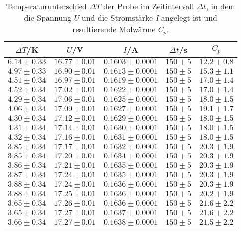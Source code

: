 \begin{table}
  \centering
  \caption{Temperaturunterschied $\Delta T$ der Probe im Zeitintervall $\Delta t$, in dem die Spannung $U$ und die Stromstärke $I$ angelegt ist und resultierende Molwärme $C_p$.}
  \label{tab:tab1}
  \begin{tabular}{c c c c c}
    \toprule
		$\Delta T$/K & $U$/V & $I$/A & $\Delta t$/s & $C_p$ \\
    \midrule
		$6.14\pm0.33$ & $16.77\pm0.01$ & $0.1603\pm0.0001$ & $150\pm5$ & $12.2\pm0.8$ \\
		$4.97\pm0.33$ & $16.90\pm0.01$ & $0.1613\pm0.0001$ & $150\pm5$ & $15.3\pm1.1$ \\
		$4.51\pm0.34$ & $16.97\pm0.01$ & $0.1619\pm0.0001$ & $150\pm5$ & $17.0\pm1.4$ \\
		$4.52\pm0.34$ & $17.02\pm0.01$ & $0.1622\pm0.0001$ & $150\pm5$ & $17.0\pm1.4$ \\
		$4.29\pm0.34$ & $17.06\pm0.01$ & $0.1625\pm0.0001$ & $150\pm5$ & $18.0\pm1.5$ \\
		$4.06\pm0.34$ & $17.09\pm0.01$ & $0.1627\pm0.0001$ & $150\pm5$ & $19.1\pm1.7$ \\
		$4.30\pm0.34$ & $17.12\pm0.01$ & $0.1629\pm0.0001$ & $150\pm5$ & $18.0\pm1.5$ \\
		$4.31\pm0.34$ & $17.14\pm0.01$ & $0.1630\pm0.0001$ & $150\pm5$ & $18.0\pm1.5$ \\
		$4.32\pm0.34$ & $17.16\pm0.01$ & $0.1631\pm0.0001$ & $150\pm5$ & $18.0\pm1.5$ \\
		$3.85\pm0.34$ & $17.17\pm0.01$ & $0.1632\pm0.0001$ & $150\pm5$ & $20.3\pm1.9$ \\
		$3.85\pm0.34$ & $17.20\pm0.01$ & $0.1634\pm0.0001$ & $150\pm5$ & $20.3\pm1.9$ \\
		$3.86\pm0.34$ & $17.21\pm0.01$ & $0.1635\pm0.0001$ & $150\pm5$ & $20.3\pm1.9$ \\
		$3.87\pm0.34$ & $17.24\pm0.01$ & $0.1635\pm0.0001$ & $150\pm5$ & $20.3\pm1.9$ \\
		$3.88\pm0.34$ & $17.24\pm0.01$ & $0.1636\pm0.0001$ & $150\pm5$ & $20.3\pm1.9$ \\
		$3.88\pm0.34$ & $17.25\pm0.01$ & $0.1636\pm0.0001$ & $150\pm5$ & $20.2\pm1.9$ \\
		$3.65\pm0.34$ & $17.26\pm0.01$ & $0.1636\pm0.0001$ & $150\pm5$ & $21.6\pm2.2$ \\
		$3.65\pm0.34$ & $17.27\pm0.01$ & $0.1637\pm0.0001$ & $150\pm5$ & $21.6\pm2.2$ \\
		$3.66\pm0.34$ & $17.27\pm0.01$ & $0.1638\pm0.0001$ & $150\pm5$ & $21.5\pm2.2$ \\

\end{tabular}
\end{table}
